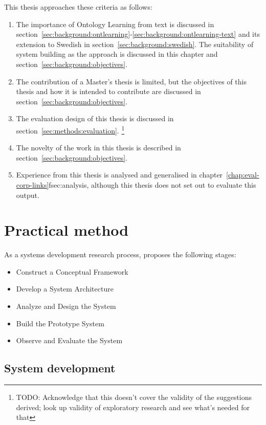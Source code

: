 \documentclass[a4paper]{report}
\newcommand{\todo}[1]{\footnote{{\color{red} TODO: #1}}}
\begin{document}
This thesis approaches these criteria as follows:
\begin{enumerate}
\item The importance of Ontology Learning from text is discussed in section~\ref{sec:background:ontlearning}-\ref{sec:background:ontlearning-text} and its extension to Swedish in section~\ref{sec:background:swedish}.
The suitability of system building as the approach is discussed in this chapter and section~\ref{sec:background:objectives}.
\item The contribution of a Master's thesis is limited, but the objectives of this thesis and how it is intended to contribute are discussed in section~\ref{sec:background:objectives}.
\item The evaluation design of this thesis is discussed in section~\ref{sec:methods:evaluation}.
\todo{Acknowledge that this doesn't cover the validity of the suggestions derived; look up validity of exploratory research and see what's needed for that}
\item The novelty of the work in this thesis is described in section~\ref{sec:background:objectives}.
\item Experience from this thesis is analysed and generalised in chapter~\ref{chap:eval-corp-links}f{sec:analysis}, although this thesis does not set out to evaluate this output.
\end{enumerate}

\section{Practical method}

As a systems development research process, \cite{NunamakerChen90SDResearch} proposes the following stages:

\begin{itemize}
\item Construct a Conceptual Framework
\item Develop a System Architecture
\item Analyze and Design the System
\item Build the Prototype System
\item Observe and Evaluate the System
\end{itemize}

\subsection{System development}
\end{document}
